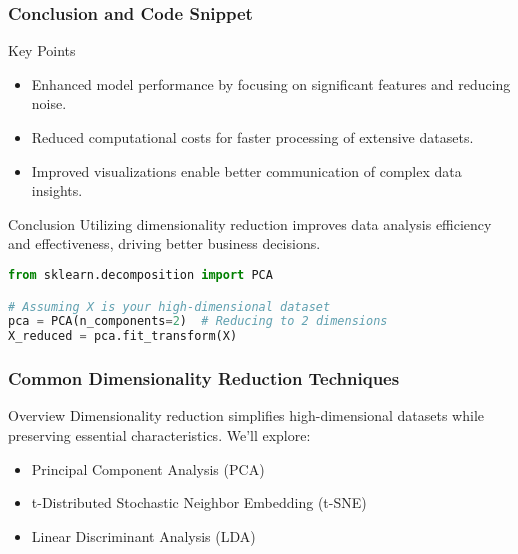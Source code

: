 \documentclass[aspectratio=169]{beamer}
\begin{document}
\begin{frame}[fragile]
    \frametitle{Conclusion and Code Snippet}
    \begin{block}{Key Points}
        \begin{itemize}
            \item Enhanced model performance by focusing on significant features and reducing noise.
            \item Reduced computational costs for faster processing of extensive datasets.
            \item Improved visualizations enable better communication of complex data insights.
        \end{itemize}
    \end{block}

    \begin{block}{Conclusion}
        Utilizing dimensionality reduction improves data analysis efficiency and effectiveness, driving better business decisions.
    \end{block}

    \begin{lstlisting}[language=Python, title=Code Snippet Example]
from sklearn.decomposition import PCA

# Assuming X is your high-dimensional dataset
pca = PCA(n_components=2)  # Reducing to 2 dimensions
X_reduced = pca.fit_transform(X)
    \end{lstlisting}
\end{frame}

\begin{frame}[fragile]
    \frametitle{Common Dimensionality Reduction Techniques}
    \begin{block}{Overview}
        Dimensionality reduction simplifies high-dimensional datasets while preserving essential characteristics. We'll explore:
        \begin{itemize}
            \item Principal Component Analysis (PCA)
            \item t-Distributed Stochastic Neighbor Embedding (t-SNE)
            \item Linear Discriminant Analysis (LDA)
        \end{itemize}
    \end{block}
\end{frame}
\end{document}
